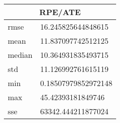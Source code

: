 \begin{table}[!ht] 
 \centering 
 \begin{tabular}{|l|l|} \hline 
 \multicolumn{2}{|c|}{RPE/ATE} \\ \hline 
 rmse & 16.245825644848615 \\ \hline 
mean & 11.837097742512125 \\ \hline 
median & 10.364931835493715 \\ \hline 
std & 11.126992761615119 \\ \hline 
min & 0.18507979852972148 \\ \hline 
max & 45.42393181849746 \\ \hline 
sse & 63342.444211877024 \\ \hline 
\end{tabular} 
 \end{table}